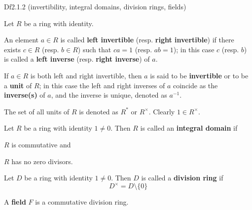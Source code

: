 \documentclass{article}
\begin{document}
\begin{Df}{Df2.1.2 (invertibility, integral domains, division rings, fields)}
    \begin{compactenum}
        \item Let $R$ be a ring with identity. 
        \begin{compactenum}
            \item[(1)] An element $a \in R$ is called \textbf{left invertible} (resp. \textbf{right invertible}) if there exists $c \in R$ (resp. $b \in R$) such that $ca = 1$ (resp. $ab = 1$); in this case $c$ (resp. $b$) is called a \textbf{left inverse} (resp. \textbf{right inverse}) of $a$.
            \item[(2)] If $a\in R$ is both left and right invertible, then $a$ is said to be \textbf{invertible} or to be a \textbf{unit} of $R$; \textcolor{Th}{in this case the left and right inverses of $a$ coincide as the \textbf{inverse(s)} of $a$, and the inverse is unique,} denoted as $a^{-1}$.
            \item[(3)] The set of all units of $R$ is denoted as $R^\ast$ or $R^\times$. \textcolor{Th}{Clearly $1 \in R^\times$.}
        \end{compactenum}
        \item Let $R$ be a ring with identity $1\neq 0$. Then $R$ is called an \textbf{integral domain} if 
        \begin{compactenum}
            \item[(1)] $R$ is commutative and
            \item[(2)] $R$ has no zero divisors.
        \end{compactenum}
        \item Let $D$ be a ring with identity $1\neq 0$. Then $D$ is called a \textbf{division ring} if
        $$ D^\times = D \setminus \{0\} $$
        \item A \textbf{field} $F$ is a commutative division ring. 
    \end{compactenum}
\end{Df}
\end{document}
